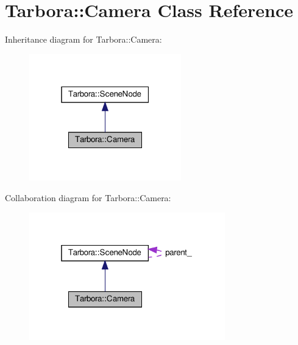 \hypertarget{classTarbora_1_1Camera}{}\section{Tarbora\+:\+:Camera Class Reference}
\label{classTarbora_1_1Camera}


Inheritance diagram for Tarbora\+:\+:Camera\+:\nopagebreak
\begin{figure}[H]
\begin{center}
\leavevmode
\includegraphics[width=187pt]{classTarbora_1_1Camera__inherit__graph}
\end{center}
\end{figure}


Collaboration diagram for Tarbora\+:\+:Camera\+:\nopagebreak
\begin{figure}[H]
\begin{center}
\leavevmode
\includegraphics[width=241pt]{classTarbora_1_1Camera__coll__graph}
\end{center}
\end{figure}
